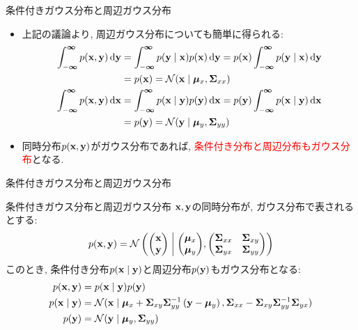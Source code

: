 \documentclass[dvipdfmx,notheorems,t]{beamer}
\begin{document}
\begin{frame}{条件付きガウス分布と周辺ガウス分布}
\begin{itemize}
  \item 上記の議論より, 周辺ガウス分布についても簡単に得られる:
  \begin{align*}
    \int_{-\boldsymbol{\infty}}^{\boldsymbol{\infty}} p(\vb{x}, \vb{y}) \dd{\vb{y}}
    &= \int_{-\boldsymbol{\infty}}^{\boldsymbol{\infty}} p(\vb{y} \mid \vb{x}) p(\vb{x}) \dd{\vb{y}}
    = p(\vb{x}) \int_{-\boldsymbol{\infty}}^{\boldsymbol{\infty}} p(\vb{y} \mid \vb{x}) \dd{\vb{y}} \\
    &= p(\vb{x}) = \mathcal{N}(\vb{x} \mid \vb*{\mu}_x, \vb{\Sigma}_{xx}) \\
    \int_{-\boldsymbol{\infty}}^{\boldsymbol{\infty}} p(\vb{x}, \vb{y}) \dd{\vb{x}}
    &= \int_{-\boldsymbol{\infty}}^{\boldsymbol{\infty}} p(\vb{x} \mid \vb{y}) p(\vb{y}) \dd{\vb{x}}
    = p(\vb{y}) \int_{-\boldsymbol{\infty}}^{\boldsymbol{\infty}} p(\vb{x} \mid \vb{y}) \dd{\vb{x}} \\
    &= p(\vb{y}) = \mathcal{N}(\vb{y} \mid \vb*{\mu}_y, \vb{\Sigma}_{yy})
  \end{align*}
  \item 同時分布$p(\vb{x}, \vb{y})$がガウス分布であれば, \textcolor{red}{条件付き分布と周辺分布もガウス分布}となる.
\end{itemize}
\end{frame}

\begin{frame}{条件付きガウス分布と周辺ガウス分布}
\begin{block}{条件付きガウス分布と周辺ガウス分布}
  $\vb{x}, \vb{y}$の同時分布が, ガウス分布で表されるとする:
  \begin{align*}
    p(\vb{x}, \vb{y}) = \mathcal{N} \left( \mqty(\vb{x} \\ \vb{y}) \middlerel|
      \mqty(\vb*{\mu}_x \\ \vb*{\mu}_y),
      \mqty(\vb{\Sigma}_{xx} & \vb{\Sigma}_{xy} \\
        \vb{\Sigma}_{yx} & \vb{\Sigma}_{yy}) \right)
  \end{align*}
  このとき, 条件付き分布$p(\vb{x} \mid \vb{y})$と周辺分布$p(\vb{y})$もガウス分布となる:
  \begin{align*}
    p(\vb{x}, \vb{y}) &= p(\vb{x} \mid \vb{y}) p(\vb{y}) \\
    p(\vb{x} \mid \vb{y}) &= \mathcal{N}(\vb{x} \mid \vb*{\mu}_x
      + \vb{\Sigma}_{xy} \vb{\Sigma}_{yy}^{-1} \left( \vb{y} - \vb*{\mu}_y \right),
      \vb{\Sigma}_{xx} - \vb{\Sigma}_{xy} \vb{\Sigma}_{yy}^{-1} \vb{\Sigma}_{yx}) \\
    p(\vb{y}) &= \mathcal{N}(\vb{y} \mid \vb*{\mu}_y, \vb{\Sigma}_{yy})
  \end{align*}
\end{block}
\end{frame}
\end{document}
